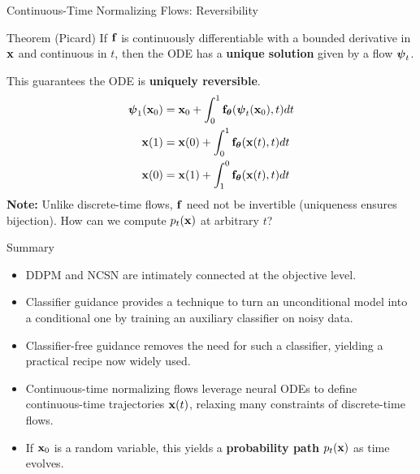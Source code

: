 \documentclass{beamer}
\begin{document}
\begin{frame}{Continuous-Time Normalizing Flows: Reversibility}
	\begin{block}{Theorem (Picard)}
		If $\mathbf{f}$ is continuously differentiable with a bounded derivative in $\mathbf{x}$ and continuous in $t$, then the ODE has a \textbf{unique solution} given by a flow $\boldsymbol{\psi}_t$.
	\end{block}
	\eqpause
	This guarantees the ODE is \textbf{uniquely reversible}. 
	\begin{align*}
		\boldsymbol{\psi}_1(\mathbf{x}_0) &= \mathbf{x}_0 + \int_{0}^{1} \mathbf{f}_{\boldsymbol{\theta}}(\boldsymbol{\psi}_t(\mathbf{x}_0), t) dt \\
		\mathbf{x}(1) &= \mathbf{x}(0) + \int_{0}^{1} \mathbf{f}_{\boldsymbol{\theta}}(\mathbf{x}(t), t) dt \\
		\mathbf{x}(0) &= \mathbf{x}(1) + \int_{1}^{0} \mathbf{f}_{\boldsymbol{\theta}}(\mathbf{x}(t), t) dt
	\end{align*}
	\eqpause
	\textbf{Note:} Unlike discrete-time flows, $\mathbf{f}$ need not be invertible (uniqueness ensures bijection).
	\eqpause
	How can we compute $p_t(\mathbf{x})$ at arbitrary $t$?
\end{frame}
\begin{frame}{Summary}
	\begin{itemize}
		\item DDPM and NCSN are intimately connected at the objective level.	
		\vfill
		\item Classifier guidance provides a technique to turn an unconditional model into a conditional one by training an auxiliary classifier on noisy data.
		\vfill
		\item Classifier-free guidance removes the need for such a classifier, yielding a practical recipe now widely used.
		\vfill 
		\item Continuous-time normalizing flows leverage neural ODEs to define continuous-time trajectories $\mathbf{x}(t)$, relaxing many constraints of discrete-time flows.
		\vfill
		\item If $\mathbf{x}_0$ is a random variable, this yields a \textbf{probability path} $p_t(\mathbf{x})$ as time evolves.
	\end{itemize}
\end{frame}
\end{document}
